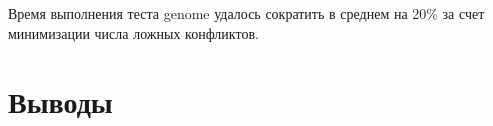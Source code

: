 Время выполнения теста genome удалось сократить в среднем на 20\% за счет 
минимизации числа ложных конфликтов.

\section{Выводы}









\clearpage


